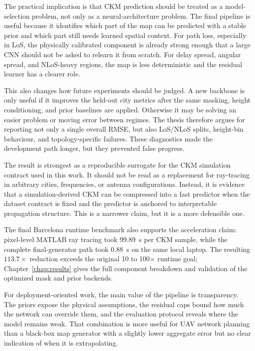 The practical implication is that CKM prediction should be treated as a
model-selection problem, not only as a neural-architecture problem. The final
pipeline is useful because it identifies which part of the map can be predicted
with a stable prior and which part still needs learned spatial context. For
path loss, especially in LoS, the physically calibrated component is already
strong enough that a large CNN should not be asked to relearn it from scratch.
For delay spread, angular spread, and NLoS-heavy regions, the map is less
deterministic and the residual learner has a clearer role.

This also changes how future experiments should be judged. A new backbone is
only useful if it improves the held-out city metrics after the same masking,
height conditioning, and prior baselines are applied. Otherwise it may be
solving an easier problem or moving error between regimes. The thesis therefore
argues for reporting not only a single overall RMSE, but also LoS/NLoS splits,
height-bin behaviour, and topology-specific failures. These diagnostics made
the development path longer, but they prevented false progress.

The result is strongest as a reproducible surrogate for the CKM simulation
contract used in this work. It should not be read as a replacement for
ray-tracing in arbitrary cities, frequencies, or antenna configurations.
Instead, it is evidence that a simulation-derived CKM can be compressed into a
fast predictor when the dataset contract is fixed and the predictor is anchored
to interpretable propagation structure. This is a narrower claim, but it is a
more defensible one.

The final Barcelona runtime benchmark also supports the acceleration claim:
pixel-level MATLAB ray tracing took \SI{99.89}{s} per CKM sample, while the
complete final-generator path took \SI{0.88}{s} on the same local laptop. The
resulting \(113.7\times\) reduction exceeds the original 10 to 100\(\times\)
runtime goal; Chapter~\ref{chap:results} gives the full component breakdown and
validation of the optimized mask and prior backends.

For deployment-oriented work, the main value of the pipeline is transparency.
The priors expose the physical assumptions, the residual caps bound how much
the network can override them, and the evaluation protocol reveals where the
model remains weak. That combination is more useful for UAV network planning
than a black-box map generator with a slightly lower aggregate error but no
clear indication of when it is extrapolating.

